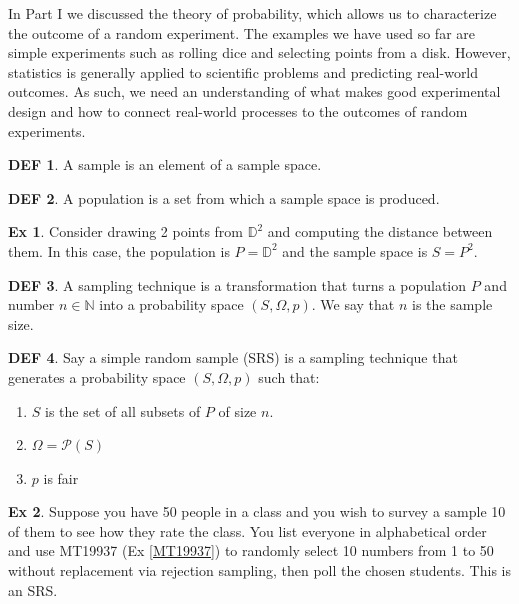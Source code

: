 \documentclass{article}
\theoremstyle{definition}\newtheorem{definition}{DEF}
\theoremstyle{definition}\newtheorem{example}{Ex}
\theoremstyle{lemma}\newtheorem{lemma}{Lemma}
\theoremstyle{corrolary}\newtheorem{corrolary}{Cor}
\begin{document}
In Part I we discussed the theory of probability, which allows us to characterize the outcome of a random experiment.
The examples we have used so far are simple experiments such as rolling dice and selecting points from a disk.
However, statistics is generally applied to scientific problems and predicting real-world outcomes.
As such, we need an understanding of what makes good experimental design and how to connect real-world processes to the outcomes of random experiments.

\begin{definition}
A sample is an element of a sample space.
\end{definition}

\begin{definition}
A population is a set from which a sample space is produced.
\end{definition}

\begin{example}
Consider drawing 2 points from $\mathbb{D}^2$ and computing the distance between them.
In this case, the population is $P=\mathbb{D}^2$ and the sample space is $S=P^2$.
\end{example}

\begin{definition}
A sampling technique is a transformation that turns a population $P$ and number $n\in \mathbb{N}$ into a probability space $(S, \Omega, p)$.
We say that $n$ is the sample size.
\end{definition}

\begin{definition}
Say a simple random sample (SRS) is a sampling technique that generates a probability space $(S, \Omega, p)$ such that:
\begin{enumerate}
\item $S$ is the set of all subsets of $P$ of size $n$.
\item $\Omega = \mathcal{P}(S)$
\item $p$ is fair
\end{enumerate}
\end{definition}

\begin{example}
Suppose you have 50 people in a class and you wish to survey a sample 10 of them to see how they rate the class.
You list everyone in alphabetical order and use MT19937 (Ex \ref{MT19937}) to randomly select 10 numbers from 1 to 50 without replacement via rejection sampling, then poll the chosen students.
This is an SRS.
\end{example}
\end{document}
